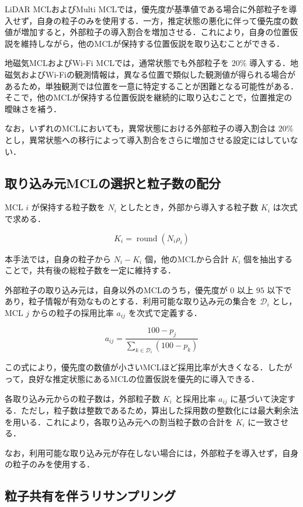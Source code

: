 LiDAR MCLおよびMulti MCLでは，優先度が基準値である場合に外部粒子を導入せず，自身の粒子のみを使用する．一方，推定状態の悪化に伴って優先度の数値が増加すると，外部粒子の導入割合を増加させる．これにより，自身の位置仮説を維持しながら，他のMCLが保持する位置仮説を取り込むことができる．

地磁気MCLおよびWi-Fi MCLでは，通常状態でも外部粒子を $20\%$ 導入する．地磁気およびWi-Fiの観測情報は，異なる位置で類似した観測値が得られる場合があるため，単独観測では位置を一意に特定することが困難となる可能性がある．そこで，他のMCLが保持する位置仮説を継続的に取り込むことで，位置推定の曖昧さを補う．

なお，いずれのMCLにおいても，異常状態における外部粒子の導入割合は $20\%$ とし，異常状態への移行によって導入割合をさらに増加させる設定にはしていない．

\subsection{取り込み元MCLの選択と粒子数の配分}

MCL $i$ が保持する粒子数を $N_i$ としたとき，外部から導入する粒子数 $K_i$ は次式で求める．

\[
K_i=\operatorname{round}(N_i\rho_i)
\]

本手法では，自身の粒子から $N_i-K_i$ 個，他のMCLから合計 $K_i$ 個を抽出することで，共有後の総粒子数を一定に維持する．

外部粒子の取り込み元は，自身以外のMCLのうち，優先度が $0$ 以上 $95$ 以下であり，粒子情報が有効なものとする．利用可能な取り込み元の集合を $\mathcal{D}_i$ とし，MCL $j$ からの粒子の採用比率 $a_{ij}$ を次式で定義する．

\[
a_{ij}=
\frac{100-p_j}
{\displaystyle\sum_{k\in\mathcal{D}_i}(100-p_k)}
\]

この式により，優先度の数値が小さいMCLほど採用比率が大きくなる．したがって，良好な推定状態にあるMCLの位置仮説を優先的に導入できる．

各取り込み元からの粒子数は，外部粒子数 $K_i$ と採用比率 $a_{ij}$ に基づいて決定する．ただし，粒子数は整数であるため，算出した採用数の整数化には最大剰余法を用いる．これにより，各取り込み元への割当粒子数の合計を $K_i$ に一致させる．

なお，利用可能な取り込み元が存在しない場合には，外部粒子を導入せず，自身の粒子のみを使用する．

\subsection{粒子共有を伴うリサンプリング}

